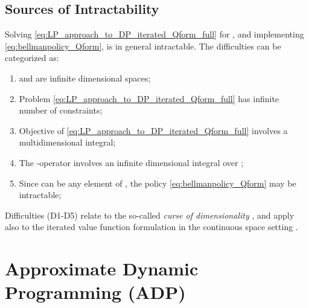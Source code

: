 \documentclass[journal]{IEEEtran}
\begin{document}
\subsection{Sources of Intractability} \label{sec:dp_intractabilities}


Solving \eqref{eq:LP_approach_to_DP_iterated_Qform_full} for , and implementing \eqref{eq:bellmanpolicy_Qform}, is in general intractable. The difficulties can be categorized as:
	\begin{enumerate}
		\renewcommand{\labelenumi}{(D\theenumi)}
		\item  and  are infinite dimensional spaces;
		
		\item Problem \eqref{eq:LP_approach_to_DP_iterated_Qform_full} has infinite number of constraints;
		
		\item Objective of \eqref{eq:LP_approach_to_DP_iterated_Qform_full} involves a multidimensional integral;
		
		\item The -operator involves an infinite dimensional integral over ;
		
		\item Since  can be any element of , the policy \eqref{eq:bellmanpolicy_Qform} may be intractable;
	\end{enumerate}

Difficulties (D1-D5) relate to the so-called  \emph{curse of dimensionality} \cite{powell_knowAboutADP}, and apply also to the iterated value function formulation in the continuous space setting \cite{boyd_iteratedBellman}. 




\section{Approximate Dynamic Programming (ADP)}\label{sec:adp}
\end{document}
